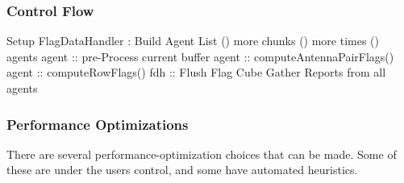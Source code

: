 \subsubsection{Control Flow}



\begin{algorithm}
  \SetLine
  \dontprintsemicolon
  \vspace{0.5cm} 
  \vspace{0.5cm} 
  {Setup FlagDataHandler :} \;
  {Build Agent List }\;
  \While () { more chunks }
  {
    \While () { more times }
    {
      \ForAll () { agents }
      {
        {
          {agent :: pre-Process current buffer}\;
             {
               {
                  {agent :: computeAntennaPairFlags()}\;
               }
             }
             {
               {
                {agent :: computeRowFlags() }\;
               }
             }
        }
      }
    }
    {fdh :: Flush Flag Cube}\;
  }
  {Gather Reports from all agents} \;
\end{algorithm}





\subsubsection{Performance Optimizations}



There are several performance-optimization choices that can be made. 
Some of these are under the users control, and some have automated heuristics.

